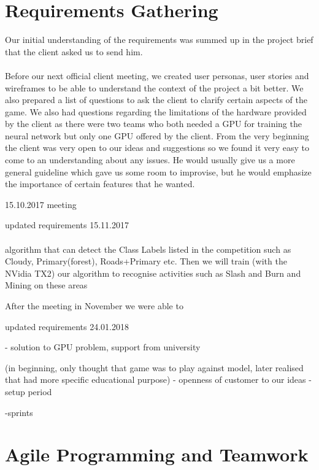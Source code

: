 \documentclass{l3proj}
\begin{document}
\section{Requirements Gathering}
\label{sec:requirements}

Our initial understanding of the requirements was summed up in the project brief that the client asked us to send him. 
\\\\
Before our next official client meeting, we created user personas, user stories and wireframes to be able to understand the context of the project a bit better. We also prepared a list of questions to ask the client to clarify certain aspects of the game. We also had questions regarding the limitations of the hardware provided by the client as there were two teams who both needed a GPU for training the neural network but only one GPU offered by the client. From the very beginning the client was very open to our ideas and suggestions so we found it very easy to come to an understanding about any issues. He would usually give us a more general guideline which gave us some room to improvise, but he would emphasize the importance of certain features that he wanted. 

15.10.2017 meeting


updated requirements 15.11.2017
\\\\
 algorithm that can detect the Class Labels listed in the competition such as Cloudy, Primary(forest), Roads+Primary etc. Then we will train (with the NVidia TX2) our algorithm to recognise activities such as Slash and Burn and Mining on these areas
 
After the meeting in November we were able to 

updated requirements 24.01.2018

- solution to GPU problem, support from university 

(in beginning, only thought that game was to play against model, later realised that had more specific educational purpose)
- openness of customer to our ideas
-setup period

-sprints


\section{Agile Programming and Teamwork}
\label{sec:agile}
\end{document}
